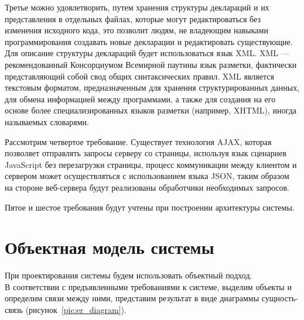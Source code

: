 \documentclass[14pt,a4paper]{reportmod}
\begin{document}
Третье можно удовлетворить, путем хранения структуры деклараций и их представления в отдельных файлах, которые могут редактироваться без изменения исходного кода, это позволит людям, не владеющим навыками программирования создавать новые декларации и редактировать существующие. Для описание структуры деклараций будет использоваться язык XML. XML --- рекомендованный Консорциумом Всемирной паутины язык разметки, фактически представляющий собой свод общих синтаксических правил. XML является текстовым форматом, предназначенным для хранения структурированных данных, для обмена информацией между программами, а также для создания на его основе более специализированных языков разметки (например, XHTML), иногда называемых словарями.

Рассмотрим четвертое требование. Существует технология AJAX, которая позволяет отправлять запросы серверу со страницы, используя язык сценариев JavaScript без перезагрузки страницы, процесс коммуникации между клиентом и сервером может осуществляться с использованием языка JSON, таким образом на стороне веб-сервера будут реализованы обработчики необходимых запросов.


Пятое и шестое требования будут учтены при построении архитектуры системы.

\section{Объектная модель системы}
При проектирования системы будем использовать объектный подход.\\
В соответствии с предъявленными требованиями к системе, выделим объекты и определим связи между ними, представим результат в виде диаграммы сущность-связь (рисунок~\ref{pic:er_diagram}).
\end{document}

